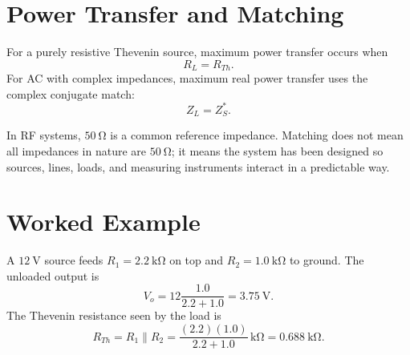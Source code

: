 \section{Power Transfer and Matching}
For a purely resistive Thevenin source, maximum power transfer occurs when
\[
R_L=R_{Th}.
\]
For AC with complex impedances, maximum real power transfer uses the complex
conjugate match:
\[
Z_L=Z_S^*.
\]

\begin{exambox}
In RF systems, \(\SI{50}{\ohm}\) is a common reference impedance. Matching does
not mean all impedances in nature are \(\SI{50}{\ohm}\); it means the system has
been designed so sources, lines, loads, and measuring instruments interact in a
predictable way.
\end{exambox}

\section{Worked Example}
A \(\SI{12}{\volt}\) source feeds \(R_1=\SI{2.2}{\kilo\ohm}\) on top and
\(R_2=\SI{1.0}{\kilo\ohm}\) to ground. The unloaded output is
\[
V_o=12\frac{1.0}{2.2+1.0}=\SI{3.75}{\volt}.
\]
The Thevenin resistance seen by the load is
\[
R_{Th}=R_1\parallel R_2
=\frac{(2.2)(1.0)}{2.2+1.0}\,\si{\kilo\ohm}
=\SI{0.688}{\kilo\ohm}.
\]

